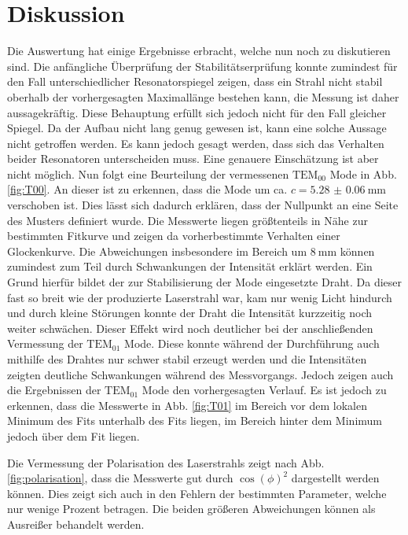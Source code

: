 
\section{Diskussion}
\label{sec:Diskussion}
Die Auswertung hat einige Ergebnisse erbracht, welche nun noch zu diskutieren sind. Die anfängliche Überprüfung der Stabilitätserprüfung konnte zumindest für den Fall unterschiedlicher Resonatorspiegel zeigen, dass ein Strahl nicht stabil oberhalb der vorhergesagten Maximallänge bestehen kann, die Messung ist daher aussagekräftig. Diese Behauptung erfüllt sich jedoch nicht für den Fall gleicher Spiegel. Da der Aufbau nicht lang genug gewesen ist, kann eine solche Aussage nicht getroffen werden. Es kann jedoch gesagt werden, dass sich das Verhalten beider Resonatoren unterscheiden muss. Eine genauere Einschätzung ist aber nicht möglich. Nun folgt eine Beurteilung der vermessenen $\text{TEM}_\text{00}$ Mode in Abb. \ref{fig:T00}. An dieser ist zu erkennen, dass die Mode um ca. $c = \SI{5.28(6)}{\milli\meter}$ verschoben ist. Dies lässt sich dadurch erklären, dass der Nullpunkt an eine Seite des Musters definiert wurde. Die Messwerte liegen größtenteils in Nähe zur bestimmten Fitkurve und zeigen da vorherbestimmte Verhalten einer Glockenkurve. Die Abweichungen insbesondere im Bereich um $\SI{8}{\milli\meter}$ können zumindest zum Teil durch Schwankungen der Intensität erklärt werden. Ein Grund hierfür bildet der zur Stabilisierung der Mode eingesetzte Draht. Da dieser fast so breit wie der produzierte Laserstrahl war, kam nur wenig Licht hindurch und durch kleine Störungen konnte der Draht die Intensität kurzzeitig noch weiter schwächen. Dieser Effekt wird noch deutlicher bei der anschließenden Vermessung der $\text{TEM}_{01}$ Mode. Diese konnte während der Durchführung auch mithilfe des Drahtes nur schwer stabil erzeugt werden und die Intensitäten zeigten deutliche Schwankungen während des Messvorgangs. Jedoch zeigen auch die Ergebnissen der $\text{TEM}_{01}$ Mode den vorhergesagten Verlauf. Es ist jedoch zu erkennen, dass die Messwerte in Abb. \ref{fig:T01} im Bereich vor dem lokalen Minimum des Fits unterhalb des Fits liegen, im Bereich hinter dem Minimum jedoch über dem Fit liegen. 


Die Vermessung der Polarisation des Laserstrahls zeigt nach Abb. \ref{fig:polarisation}, dass die Messwerte gut durch $\cos(\phi)^2$ dargestellt werden können. Dies zeigt sich auch in den Fehlern der bestimmten Parameter, welche nur wenige Prozent betragen. Die beiden größeren Abweichungen können als Ausreißer behandelt werden.
